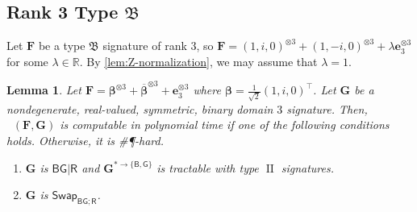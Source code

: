 \documentclass[11pt]{article}
\newtheorem{lemma}[theorem]{Lemma}
\DeclareMathOperator{\holts}{Holant^*_3}
\DeclareMathOperator{\typeii}{II}
\newcommand{\db}{\mathsf{B}}
\newcommand{\dg}{\mathsf{G}}
\newcommand{\dr}{\mathsf{R}}
\newcommand{\swhelper}[1]{$\mathsf{Swap}_{#1}$\xspace}
\newcommand{\swbg}{\swhelper{\db \dg; \dr}}
\newcommand{\sph}{\#\P-hard\xspace}
\newcommand{\teh}{^{\otimes 3}}
\newcommand{\transpose}{^\intercal}
\newcommand{\domres}[1]{
  ^{*\to\{#1\}}
}
\newcommand{\ternarytractz}{$\mathfrak{B}$\xspace}
\begin{document}
\subsection{Rank 3 Type \texorpdfstring{\ternarytractz}{B}}
Let $\mathbf{F}$ be a type \ternarytractz signature of rank $3$, so $\mathbf{F} = (1, i, 0)\teh + (1, -i, 0)\teh + \lambda \mathbf{e}_3\teh$ for some $\lambda \in \mathbb{R}$.
By \cref{lem:Z-normalization}, we may assume that $\lambda = 1$.
\begin{lemma}\label{lem:dichotomy-single-ternary-rank-3-z-single-binary}
  Let $\mathbf{F} = \boldsymbol{\beta}\teh + \overline{\boldsymbol{\beta}}\teh + \mathbf{e}_3 \teh$ where $\boldsymbol{\beta} = \frac{1}{\sqrt{2}}(1, i, 0)\transpose$.
  Let $\mathbf{G}$ be a nondegenerate, real-valued, symmetric, binary domain $3$ signature.
  Then, $\holts(\mathbf{F}, \mathbf{G})$ is computable in polynomial time if one of the following conditions holds. Otherwise, it is \sph.
  \begin{enumerate}
    \item $\mathbf{G}$ is $\db \dg | \dr$ and $\mathbf{G}\domres{\db, \dg}$ is tractable with type $\typeii$ signatures.
    \item $\mathbf{G}$ is \swbg.
  \end{enumerate}
\end{lemma}
\end{document}

